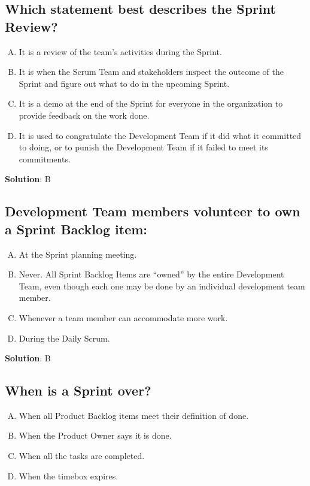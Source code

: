 \subsection{Which statement best describes the Sprint Review?}
\begin{enumerate}[A)]
  \item It is a review of the team's activities during the Sprint.
  \item It is when the Scrum Team and stakeholders inspect the outcome of the Sprint and figure out what to do in the upcoming Sprint.
  \item It is a demo at the end of the Sprint for everyone in the organization to provide feedback on the work done.
  \item It is used to congratulate the Development Team if it did what it committed to doing, or to punish the Development Team if it failed to meet its commitments.
\end{enumerate}


\textbf{Solution}: B


\subsection{Development Team members volunteer to own a Sprint Backlog item:}
\begin{enumerate}[A)]
  \item At the Sprint planning meeting.
  \item Never. All Sprint Backlog Items are \enquote{owned} by the entire Development Team, even though each one may be done by an individual development team member.
  \item Whenever a team member can accommodate more work.
  \item During the Daily Scrum.
\end{enumerate}


\textbf{Solution}: B


\subsection{When is a Sprint over?}
\begin{enumerate}[A)]
  \item When all Product Backlog items meet their definition of done.
  \item When the Product Owner says it is done.
  \item When all the tasks are completed.
  \item When the timebox expires.
\end{enumerate}


